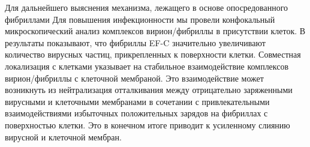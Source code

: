     

    
    Для дальнейшего выяснения механизма, лежащего в основе опосредованного фибриллами Для повышения инфекционности мы провели конфокальный микроскопический анализ комплексов вирион/фибриллы в присутствии клеток. В результаты показывают, что фибриллы EF-C значительно увеличивают количество вирусных частиц, прикрепленных к поверхности клетки. Совместная локализация с клетками указывает на стабильное взаимодействие комплексов вирион/фибриллы с клеточной мембраной. Это взаимодействие может возникнуть из нейтрализация отталкивания между отрицательно заряженными вирусными и клеточными мембранами в сочетании с привлекательными взаимодействиями избыточных положительных зарядов на фибриллах с поверхностью клетки. Это в конечном итоге приводит к усиленному слиянию вирусной и клеточной мембран.
    
